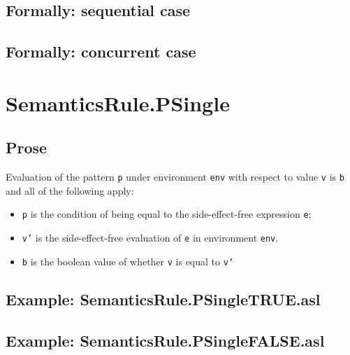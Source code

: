 \documentclass{book}
\begin{document}
\begin{emptyformal}
  \subsection{Formally: sequential case}

  \subsection{Formally: concurrent case}
\end{emptyformal}


\section{SemanticsRule.PSingle \label{sec:SemanticsRule.PSingle}}

    \subsection{Prose}
  Evaluation of the pattern \texttt{p} under environment \texttt{env} with
  respect to value \texttt{v} is \texttt{b} and all of the following apply:
    \begin{itemize}
      \item \texttt{p} is the condition of being equal to the side-effect-free expression \texttt{e};
      \item \texttt{v'} is the side-effect-free evaluation of \texttt{e} in environment \texttt{env}.
      \item \texttt{b} is the boolean value of whether \texttt{v} is equal to \texttt{v'}
    \end{itemize}

    \subsection{Example: SemanticsRule.PSingleTRUE.asl}

    \subsection{Example: SemanticsRule.PSingleFALSE.asl}
\end{document}
